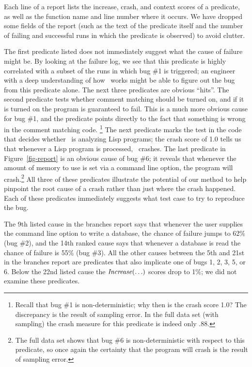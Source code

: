 Each line of a report lists the increase, crash, and context scores of
a predicate, as well as the function name and line number where it
occurs.  We have dropped some fields of the report (such as the text
of the predicate itself and the number of failing and successful runs
in which the predicate is observed) to avoid clutter.

The first predicate listed does not immediately suggest what the cause
of failure might be. By looking at the failure log, we see that this predicate
is highly correlated with a subset of the runs in which bug \#1 is
triggered; an engineer with a deep understanding of how \moss\ works
might be able to figure out the bug from this predicate alone.
The next three predicates are obvious ``hits''. The second predicate
tests whether comment matching should be turned on, and if it is turned on the program is
guaranteed to fail. This is a much more obvious cause for bug \#1, and the predicate points directly
to the fact that something is wrong in the comment matching code.
\footnote{Recall that bug \#1 is non-deterministic; why then is the crash score 1.0?
The discrepancy is the result of sampling error.  In the full data set
(with  sampling) the crash measure for this predicate is indeed
only .88.}
The
next predicate marks the test in the code that decides whether \moss\ is analyzing Lisp
programs; the crash score of 1.0 tells us that whenever a Lisp program is
processed, \moss\ crashes.  The last predicate in
Figure~\ref{fig-report} is an obvious cause of
bug \#6; it reveals that whenever the amount of memory to use is set
via a command line option, the program will crash.\footnote{The full data set shows that bug \#6 is non-deterministic with respect to this predicate, so once again the certainty that the program will crash is the result of sampling error.}  All three of these predicates illustrate the potential of our method to
help pinpoint the root cause of a crash rather than just where the crash
happened.  Each of these predicates immediately suggests
what test case to try to reproduce the bug.

The 9th listed cause in the branches report says that whenever the
user supplies the command line option to write a database, the chance
of failure jumps to 62\% (bug \#2), and the 14th ranked cause says
that whenever a database is read the chance of failure is 55\% (bug
\#3).  All the other causes between the 5th and 21st in the branches
report are predicates that also implicate one of bugs 1, 2, 3, 5, or
6.  Below the 22nd listed cause the $\mbox{\textit{Increase}}(\ldots)$ scores drop to
1\%; we did not examine these predicates.

